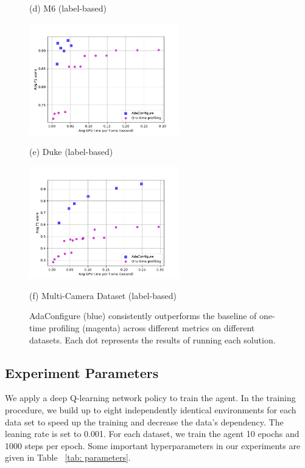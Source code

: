 \begin{figure}[!t]
\begin{minipage}[t]{0.32\linewidth}
		\centerline{(d) M6 (label-based)}
	\end{minipage}
	\hfill
	\begin{minipage}[t]{0.32\linewidth}
		\centerline{\includegraphics[width=6.5cm]{figures/duke_label.pdf}}
		\centerline{(e) Duke (label-based)}
	\end{minipage}
	\hfill
	\begin{minipage}[t]{0.32\linewidth}
		\centerline{\includegraphics[width=6.5cm]{figures/_Westbound_Eastbound_Rear_label.pdf}}
		\centerline{(f) Multi-Camera Dataset (label-based)}
	\end{minipage}		
	\caption{AdaConfigure (blue) consistently outperforms the baseline of one-time profiling (magenta) across different metrics on different datasets. Each dot represents the results of running each solution.}
	\label{fig: results}
\end{figure}


\subsection{Experiment Parameters}
We apply a deep Q-learning network policy to train the agent. In the training procedure, we build up to eight independently identical environments for each data set to speed up the training and decrease the data's dependency. The leaning rate is set to 0.001. For each dataset, we train the agent 10 epochs and 1000 steps per epoch. Some important hyperparameters in our experiments are given in Table ~\ref{tab: parameters}.


